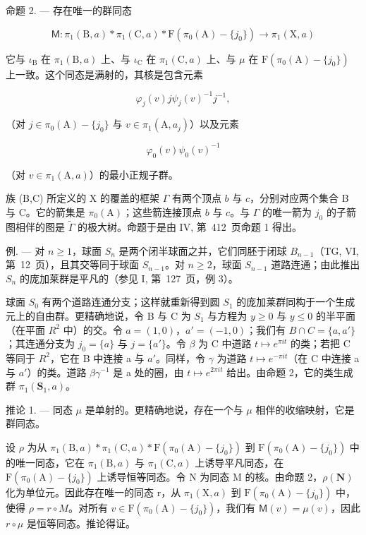 命题 2. --- 存在唯一的群同态

\[
\mathsf {M} \colon \pi_ {1} (\mathrm{B}, a) * \pi_ {1} (\mathrm{C}, a) * \mathrm{F} (\pi_ {0} (\mathrm{A}) - \{j _ {0} \}) \to \pi_ {1} (\mathrm{X}, a)
\]

它与 \(\iota_{\mathrm{B}}\) 在 \(\pi_1(\mathrm{B},a)\) 上、与 \(\iota_{\mathrm{C}}\) 在 \(\pi_1(\mathrm{C},a)\) 上、与 \(\mu\) 在 \(\mathrm{F}(\pi_0(\mathrm{A}) - \{j_0\})\) 上一致。这个同态是满射的，其核是包含元素

\[
\varphi_ {j} (v) j \psi_ {j} (v) ^ {- 1} j ^ {- 1},
\]

（对 \(j\in \pi_0(\mathrm{A}) - \{j_0\}\) 与 \(v\in \pi_1(\mathrm{A},a_j)\)）以及元素

\[
\varphi_ {0} (v) \psi_ {0} (v) ^ {- 1}
\]

（对 \(v \in \pi_1(\mathrm{A}, a)\)）的最小正规子群。

族 (B,C) 所定义的 X 的覆盖的框架 \(\Gamma\) 有两个顶点 \(b\) 与 \(c\)，分别对应两个集合 B 与 C。它的箭集是 \(\pi_0(\mathrm{A})\)；这些箭连接顶点 \(b\) 与 \(c\)。与 \(\Gamma\) 的唯一箭为 \(j_0\) 的子箭图相伴的图是 \(\widetilde{\Gamma}\) 的极大树。命题于是由 IV, 第~412~页命题 1 得出。

例. --- 对 \(n \geqslant 1\)，球面 \(S_{n}\) 是两个闭半球面之并，它们同胚于闭球 \(B_{n-1}\)（TG, VI, 第~12~页），且其交等同于球面 \(S_{n-1}\)。对 \(n \geqslant 2\)，球面 \(S_{n-1}\) 道路连通；由此推出 \(S_{n}\) 的庞加莱群是平凡的（参见 I, 第~127~页，例 3）。

球面 \(S_{0}\) 有两个道路连通分支；这样就重新得到圆 \(S_{1}\) 的庞加莱群同构于一个生成元上的自由群。更精确地说，令 B 与 C 为 \(S_{1}\) 与方程为 \(y \geqslant 0\) 与 \(y \leqslant 0\) 的半平面（在平面 \(R^{2}\) 中）的交。令 \(a = (1,0)\)，\(a' = (-1,0)\)；我们有 \(B \cap C = \{a, a'\}\)；其连通分支为 \(j_{0} = \{a\}\) 与 \(j = \{a'\}\)。令 \(\beta\) 为 C 中道路 \(t \mapsto e^{\pi it}\) 的类；若把 C 等同于 \(R^{2}\)，它在 B 中连接 a 与 \(a'\)。同样，令 \(\gamma\) 为道路 \(t \mapsto e^{-\pi it}\)（在 C 中连接 a 与 \(a'\)）的类。道路 \(\beta\gamma^{-1}\) 是 a 处的圈，由 \(t \mapsto e^{2\pi it}\) 给出。由命题 2，它的类生成群 \(\pi_{1}(\mathbf{S}_{1}, a)\)。

推论 1. --- 同态 \(\mu\) 是单射的。更精确地说，存在一个与 \(\mu\) 相伴的收缩映射，它是群同态。

设 \(\rho\) 为从 \(\pi_1(\mathrm{B},a)*\pi_1(\mathrm{C},a)*\mathrm{F}(\pi_0(\mathrm{A})-\{j_0\})\) 到 \(\mathrm{F}(\pi_0(\mathrm{A}) - \{j_0\})\) 中的唯一同态，它在 \(\pi_1(\mathrm{B},a)\) 与 \(\pi_1(\mathrm{C},a)\) 上诱导平凡同态，在 \(\mathrm{F}(\pi_0(\mathrm{A}) - \{j_0\})\) 上诱导恒等同态。令 N 为同态 M 的核。由命题 2，\(\rho (\mathbf{N})\) 化为单位元。因此存在唯一的同态 r，从 \(\pi_1(\mathrm{X},a)\) 到 \(\mathrm{F}(\pi_0(\mathrm{A}) - \{j_0\})\) 中，使得 \(\rho = r\circ M\)。对所有 \(v\in \mathrm{F}(\pi_0(\mathrm{A}) - \{j_0\})\)，我们有 \(\mathsf{M}(v) = \mu (v)\)，因此 \(r\circ \mu\) 是恒等同态。推论得证。

